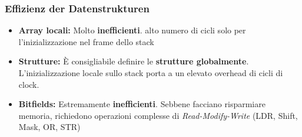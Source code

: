\subsubsection{Effizienz der Datenstrukturen}
\begin{itemize}
    \item \textbf{Array locali:} Molto \textbf{inefficienti}.
    alto numero di cicli solo per l'inizializzazione nel frame dello stack 
    \item \textbf{Strutture:} È consigliabile definire le \textbf{strutture globalmente}.
    L'inizializzazione locale sullo stack porta a un elevato overhead di cicli di clock.
    \item \textbf{Bitfields:} Estremamente \textbf{inefficienti}.
    Sebbene facciano risparmiare memoria, richiedono operazioni complesse di
     \textit{Read-Modify-Write} (LDR, Shift, Mask, OR, STR)
\end{itemize}